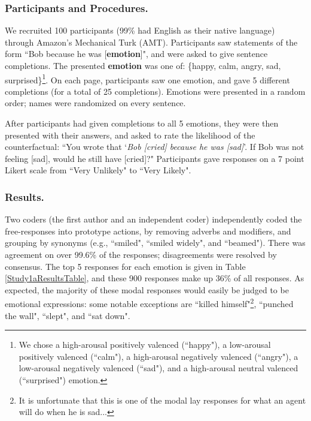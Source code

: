 \documentclass[10pt,letterpaper]{article}
\newcommand{\ndg}[1]{\textcolor{Green}{[ndg: #1]}}
\begin{document}
\subsubsection{Participants and Procedures.} 
We recruited 100 participants (99\% had English as their native language) through Amazon's Mechanical Turk (AMT). Participants saw statements of the form ``Bob \underline{\hspace{2em}} because he was [\textbf{emotion}]", and were asked to give sentence completions. The presented \textbf{emotion} was one of: \{happy, calm, angry, sad, surprised\}\footnote{We chose a high-arousal positively valenced (``happy"), a low-arousal positively valenced (``calm"), a high-arousal negatively valenced (``angry"), a low-arousal negatively valenced (``sad"), and a high-arousal neutral valenced (``surprised") emotion.}. On each page, participants saw one emotion, and gave 5 different completions (for a total of 25 completions). Emotions were presented in a random order; names were randomized on every sentence.

After participants had given completions to all 5 emotions, they were then presented with their answers, and asked to rate the likelihood of the counterfactual: ``You wrote that `\textit{Bob [cried] because he was [sad]}'. If Bob was not feeling [sad], would he still have [cried]?" Participants gave responses on a 7 point Likert scale from ``Very Unlikely" to ``Very Likely". 



\subsubsection{Results.} 
Two coders (the first author and an independent coder) independently coded the free-responses into prototype actions, by removing adverbs and modifiers, and grouping by synonyms (e.g., ``smiled", ``smiled widely", and ``beamed"). There was agreement on over 99.6\% of the responses; disagreements were resolved by consensus.
The top 5 responses for each emotion is given in Table \ref{Study1aResultsTable}, and these 900 responses make up 36\% of all responses. 
As expected, the majority of these modal responses would easily be judged to be emotional expressions: some notable exceptions are ``killed himself"\footnote{It is unfortunate that this is one of the modal lay responses for what an agent will do when he is sad...}, ``punched the wall", ``slept", and ``sat down".
\end{document}
